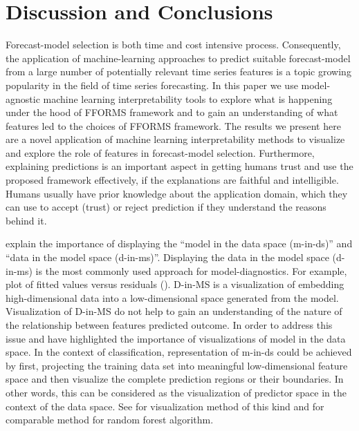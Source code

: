 \documentclass[11pt,a4paper,]{article}
\begin{document}
\section{Discussion and Conclusions}\label{conclusions}

Forecast-model selection is both time and cost intensive process.
Consequently, the application of machine-learning approaches to predict
suitable forecast-model from a large number of potentially relevant time
series features is a topic growing popularity in the field of time
series forecasting. In this paper we use model-agnostic machine learning
interpretability tools to explore what is happening under the hood of
FFORMS framework and to gain an understanding of what features led to
the choices of FFORMS framework. The results we present here are a novel
application of machine learning interpretability methods to visualize
and explore the role of features in forecast-model selection.
Furthermore, explaining predictions is an important aspect in getting
humans trust and use the proposed framework effectively, if the
explanations are faithful and intelligible. Humans usually have prior
knowledge about the application domain, which they can use to accept
(trust) or reject prediction if they understand the reasons behind it.

\textcite{wickham2015visualizing} explain the importance of displaying
the ``model in the data space (m-in-ds)'' and ``data in the model space
(d-in-ms)''. Displaying the data in the model space (d-in-ms) is the
most commonly used approach for model-diagnostics. For example, plot of
fitted values versus residuals (\textcite{wickham2015visualizing}).
D-in-MS is a visualization of embedding high-dimensional data into a
low-dimensional space generated from the model. Visualization of D-in-MS
do not help to gain an understanding of the nature of the relationship
between features predicted outcome. In order to address this issue
\textcite{wickham2015visualizing} and \textcite{da2017interactive} have
highlighted the importance of visualizations of model in the data space.
In the context of classification, representation of m-in-ds could be
achieved by first, projecting the training data set into meaningful
low-dimensional feature space and then visualize the complete prediction
regions or their boundaries. In other words, this can be considered as
the visualization of predictor space in the context of the data space.
See \textcite{wickham2015visualizing} for visualization method of this
kind and \textcite{da2017interactive} for comparable method for random
forest algorithm.
\end{document}
